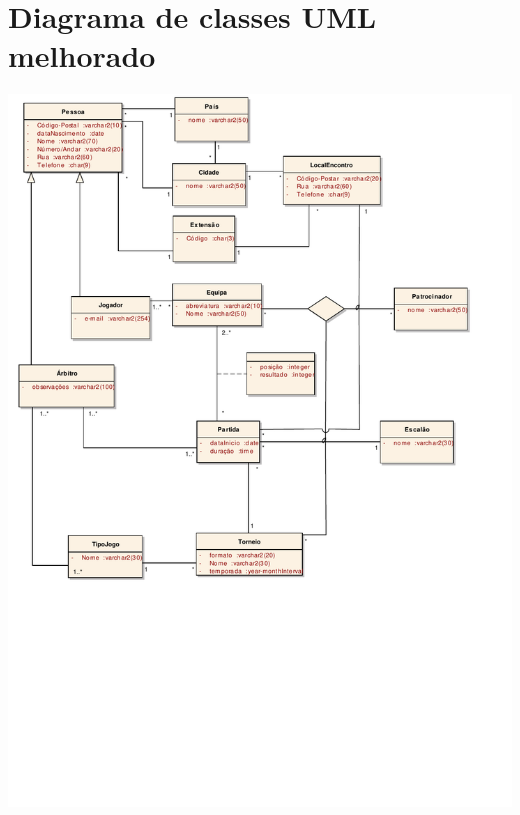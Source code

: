 \documentclass[a4paper]{article}
\begin{document}
\section{Diagrama de classes UML melhorado}
\includegraphics[scale=0.80]{./classModel.pdf}
\end{document}
